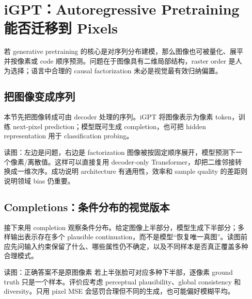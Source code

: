 \section{iGPT：Autoregressive Pretraining 能否迁移到 Pixels}

若 generative pretraining 的核心是对序列分布建模，那么图像也可被量化、展平并按像素或 code 顺序预测。问题在于图像具有二维局部结构，raster order 是人为选择；语言中合理的 causal factorization 未必是视觉最有效归纳偏置。

\subsection{把图像变成序列}

本节先把图像转成可由 decoder 处理的序列。iGPT 将图像表示为像素 token，训练 next-pixel prediction；模型既可生成 completion，也可把 hidden representation 用于 classification probing。


\begin{knowledgebox}{读图：左边是问题，右边是 factorization}
图像被按固定顺序展开，模型预测下一个像素/离散值。这样可以直接复用 decoder-only Transformer，却把二维邻接转换成一维次序。成功说明 architecture 有通用性，效率和 sample quality 的差距则说明领域 bias 仍重要。
\end{knowledgebox}

\subsection{Completions：条件分布的视觉版本}

接下来用 completion 观察条件分布。给定图像上半部分，模型生成下半部分；多样输出表示存在多个 plausible continuation，而不是模型“恢复唯一真图”。读图前应先问输入约束保留了什么、哪些属性仍不确定，以及不同样本是否真正覆盖多种合理模式。


\begin{knowledgebox}{读图：正确答案不是原图像素}
若上半张脸可对应多种下半部，逐像素 ground truth 只是一个样本。评价应考虑 perceptual plausibility、global consistency 和 diversity。只用 pixel MSE 会惩罚合理但不同的生成，也可能偏好模糊平均。
\end{knowledgebox}

